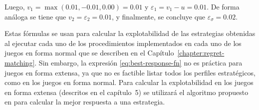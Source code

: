Luego, $v_1 = \max(0.01, -0.01, 0.00) = 0.01$ y $\varepsilon_1 = v_1 - u = 0.01$. De forma análoga se tiene que $v_2 = \varepsilon_2 = 0.01$, y finalmente, se concluye que $\varepsilon_{\sigma} = 0.02$.

Estas fórmulas se usan para calcular la explotabilidad de las estrategias obtenidas al ejecutar cada uno de los procedimientos implementados en cada uno de los juegos en forma normal que se describen en el Capítulo~\ref{chapter:regret-matching}. Sin embargo, la expresión \ref{eq:best-response-fn} no es práctica para juegos en forma extensa, ya que no es factible listar todos los perfiles estratégicos, como en los juegos en forma normal. Para calcular la explotabilidad en los juegos en forma extensa (descritos en el capítulo~5) se utilizará el algoritmo propuesto en \cite{bib:thesis-marc-lanctot} para calcular la mejor respuesta a una estrategia. 
